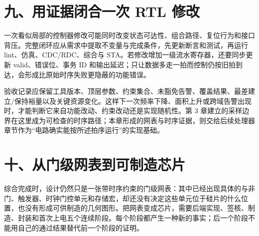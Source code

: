 \section{九、用证据闭合一次 RTL 修改}

一次看似局部的控制器修改可能同时改变状态可达性、组合路径、复位行为和接口背压。完整闭环应从需求中提取不变量与完成条件，先更新断言和测试，再运行 lint、仿真、CDC/RDC、综合与 STA。若修改增加一级流水寄存器，还要同步更新 valid、错误位、事务 ID 和输出延迟；只让数据多走一拍而控制仍按旧拍到达，会形成比原始时序失败更隐蔽的功能错误。

验收记录应保留工具版本、顶层参数、约束集合、未豁免告警、覆盖结果、最差建立/保持裕量以及关键资源变化。这样下一次频率下降、面积上升或跨域告警出现时，才能判断它来自功能改动、约束改动还是实现随机性。第 3 章建立的采样边界在这里成为可检查的时序路径；本章形成的网表与时序证据，则交给后续处理器章节作为“电路确实能按所述拍序运行”的实现基础。




























\section{十、从门级网表到可制造芯片}

综合完成时，设计仍然只是一张带时序约束的门级网表：其中已经出现具体的与非门、触发器、时钟门控单元和存储宏，却还没有决定这些单元位于硅片的什么位置，也没有形成可供制造的几何图形。把网表变成芯片，需要后端实现、签核、制造、封装和首次上电五个连续阶段。每个阶段都产生一种新的事实；后一个阶段不能用自己的通过结果替代前一个阶段的证明。

